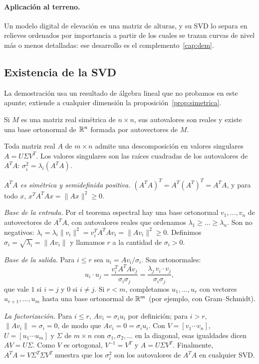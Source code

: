 \paragraph{Aplicación al terreno.} Un modelo digital de elevación es una matriz de alturas, y
su SVD lo separa en relieves ordenados por importancia a partir de los cuales se trazan curvas
de nivel más o menos detalladas: ese desarrollo es el complemento~\ref{cap:dem}.

\subsection{Existencia de la SVD}

La demostración usa un resultado de álgebra lineal que no probamos en este apunte; extiende a
cualquier dimensión la proposición~\ref{prop:simetrica}.

\begin{resultado}
Si \(M\) es una matriz real simétrica de \(n\times n\), sus autovalores son reales y existe
una base ortonormal de \(\mathbb{R}^n\) formada por autovectores de \(M\).
\end{resultado}

\begin{teorema}\label{teo:svd-existencia}
Toda matriz real \(A\) de \(m\times n\) admite una descomposición en valores singulares
\(A=U\Sigma V^T\). Los valores singulares son las raíces cuadradas de los autovalores de
\(A^TA\): \(\sigma_i^2=\lambda_i(A^TA)\).
\end{teorema}

\begin{demostracion}
\emph{\(A^TA\) es simétrica y semidefinida positiva.} \((A^TA)^T=A^T(A^T)^T=A^TA\), y para
todo \(x\), \(x^TA^TAx=\|Ax\|^2\ge0\).

\emph{Base de la entrada.} Por el teorema espectral hay una base ortonormal
\(v_1,\dots,v_n\) de autovectores de \(A^TA\), con autovalores reales que ordenamos
\(\lambda_1\ge\dots\ge\lambda_n\). Son no negativos:
\(\lambda_i=\lambda_i\|v_i\|^2=v_i^TA^TAv_i=\|Av_i\|^2\ge0\). Definimos
\(\sigma_i=\sqrt{\lambda_i}=\|Av_i\|\) y llamamos \(r\) a la cantidad de \(\sigma_i>0\).

\emph{Base de la salida.} Para \(i\le r\) sea \(u_i=Av_i/\sigma_i\). Son ortonormales:
\[
  u_i\cdot u_j=\frac{v_i^TA^TAv_j}{\sigma_i\sigma_j}=\frac{\lambda_j\,v_i\cdot v_j}{\sigma_i\sigma_j},
\]
que vale \(1\) si \(i=j\) y \(0\) si \(i\neq j\). Si \(r<m\), completamos
\(u_1,\dots,u_r\) con vectores \(u_{r+1},\dots,u_m\) hasta una base ortonormal de \(\mathbb{R}^m\)
(por ejemplo, con Gram--Schmidt).

\emph{La factorización.} Para \(i\le r\), \(Av_i=\sigma_iu_i\) por definición; para
\(i>r\), \(\|Av_i\|=\sigma_i=0\), de modo que \(Av_i=0=\sigma_iu_i\). Con
\(V=[v_1\cdots v_n]\), \(U=[u_1\cdots u_m]\) y \(\Sigma\) de \(m\times n\) con
\(\sigma_1,\sigma_2,\dots\) en la diagonal, esas igualdades dicen \(AV=U\Sigma\). Como \(V\)
es ortogonal, \(V^{-1}=V^T\) y \(A=U\Sigma V^T\). Finalmente, \(A^TA=V\Sigma^T\Sigma V^T\)
muestra que los \(\sigma_i^2\) son los autovalores de \(A^TA\) en cualquier SVD.
\end{demostracion}

